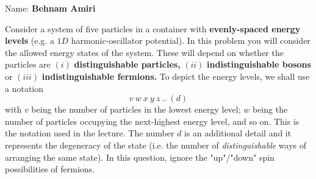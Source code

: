 \documentclass[fleqn]{article}
\begin{document}
  Name: \textbf{Behnam Amiri}

  \vspace{1cm}

  Consider a system of five particles in a container with \textbf{evenly-spaced energy levels} (e.g. a $1D$ 
  harmonic-oscillator potential).
  In this problem you will consider the allowed energy states of the system. These will depend on
  whether the particles are $(i)$ \textbf{distinguishable particles, } $(ii)$ \textbf{indistinguishable bosons}
  or $(iii)$ \textbf{indistinguishable fermions.}
  To depict the energy levels, we shall use a notation
  $$
    v ~ w ~ x ~ y ~ z ~ .. ~ (d)
  $$
  with $v$ being the number of particles in the lowest energy level; $w$ being the number of particles
  occupying the next-highest energy level, and so on. This is the notation used in the lecture. The
  number $d$ is an additional detail and it represents the degeneracy of the state (i.e. the number of
  \emph{distinguishable} ways of arranging the same state). In this question, ignore the "up"/"down" spin
  possibilities of fermions.

  \pagebreak
\end{document}
